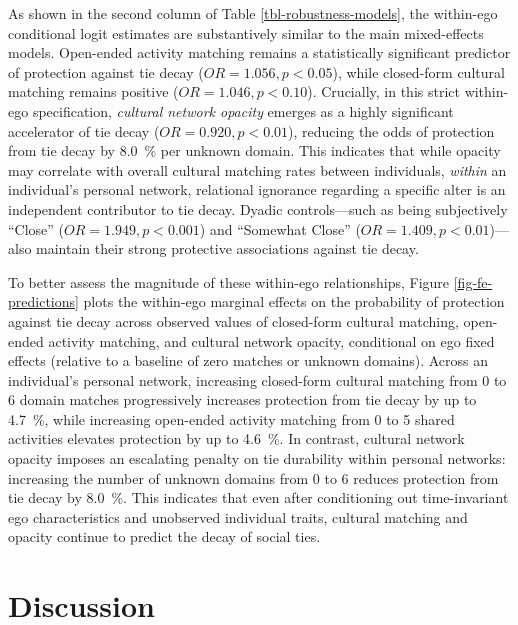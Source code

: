 \documentclass[12pt,letterpaper]{article}
\def\percent{\%}%
\begin{document}
As shown in the second column of Table \ref{tbl-robustness-models}, the within-ego conditional logit estimates are substantively similar to the main mixed-effects models. Open-ended activity matching remains a statistically significant predictor of protection against tie decay ($OR = 1.056, p < 0.05$), while closed-form cultural matching remains positive ($OR = 1.046, p < 0.10$). Crucially, in this strict within-ego specification, \textit{cultural network opacity} emerges as a highly significant accelerator of tie decay ($OR = 0.920, p < 0.01$), reducing the odds of protection from tie decay by \SI{8.0}{\percent} per unknown domain. This indicates that while opacity may correlate with overall cultural matching rates between individuals, \textit{within} an individual's personal network, relational ignorance regarding a specific alter is an independent contributor to tie decay. Dyadic controls---such as being subjectively ``Close'' ($OR = 1.949, p < 0.001$) and ``Somewhat Close'' ($OR = 1.409, p < 0.01$)---also maintain their strong protective associations against tie decay.

To better assess the magnitude of these within-ego relationships, Figure \ref{fig-fe-predictions} plots the within-ego marginal effects on the probability of protection against tie decay across observed values of closed-form cultural matching, open-ended activity matching, and cultural network opacity, conditional on ego fixed effects (relative to a baseline of zero matches or unknown domains). Across an individual's personal network, increasing closed-form cultural matching from 0 to 6 domain matches progressively increases protection from tie decay by up to \SI{4.7}{\percent}, while increasing open-ended activity matching from 0 to 5 shared activities elevates protection by up to \SI{4.6}{\percent}. In contrast, cultural network opacity imposes an escalating penalty on tie durability within personal networks: increasing the number of unknown domains from 0 to 6 reduces protection from tie decay by \SI{8.0}{\percent}. This indicates that even after conditioning out time-invariant ego characteristics and unobserved individual traits, cultural matching and opacity continue to predict the decay of social ties.



\section{Discussion}\label{discussion}
\end{document}
